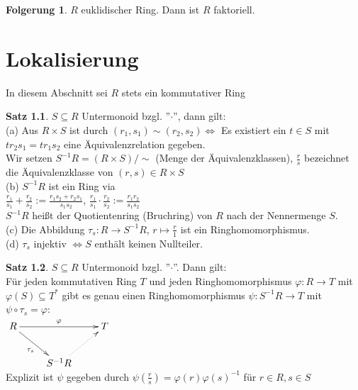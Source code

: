 \documentclass[10pt,a4paper,numbers=endperiod]{scrreprt}
\theoremstyle{definition}
\newtheorem{satz}{Satz}[section]
\newtheorem{folg}[satz]{Folgerung}
\begin{document}
\begin{folg}
	$R$ euklidischer Ring. Dann ist $R$ faktoriell.
\end{folg}

\chapter{Lokalisierung}$ $\\

In diesem Abschnitt sei $R$ stets ein kommutativer Ring

\begin{satz}
	$S \subseteq R$ Untermonoid bzgl. ''$\cdot$'', dann gilt:\\
	(a) Aus $R \times S$ ist durch $(r_1, s_1) \sim (r_2, s_2) \Leftrightarrow$ Es existiert ein $t \in S$ mit $tr_2s_1 = tr_1s_2$ eine Äquivalenzrelation gegeben.\\
	Wir setzen $S^{-1}R = (R \times S)/\sim$ (Menge der Äquivalenzklassen), $\frac{r}{s}$ bezeichnet die Äquivalenzklasse von $(r,s) \in R \times S$\\
	(b) $S^{-1}R$ ist ein Ring via\\
	$\frac{r_1}{s_1} + \frac{r_2}{s_2} := \frac{r_1s_2 + r_2s_1}{s_1s_2}$, $\frac{r_1}{s_1} \cdot \frac{r_2}{s_2} := \frac{r_1r_2}{s_1s_2}$\\
	$S^{-1}R$ heißt der Quotientenring (Bruchring) von $R$ nach der Nennermenge $S$.\\
	(c) Die Abbildung $\tau_s: R \rightarrow S^{-1}R$, $r \mapsto \frac{r}{1}$ ist ein Ringhomomorphismus.\\
	(d) $\tau_s$ injektiv $\Leftrightarrow S$ enthält keinen Nullteiler.
\end{satz}

\begin{satz}
	$S \subseteq R$ Untermonoid bzgl. ''$\cdot$''. Dann gilt:\\
	Für jeden kommutativen Ring $T$ und jeden Ringhomomorphismus $\varphi: R \rightarrow T$ mit $\varphi(S) \subseteq T^*$ gibt es genau einen Ringhomomorphismus $\psi: S^{-1} R \rightarrow T$ mit $\psi \circ \tau_s = \varphi$:\\
	$\begin{xy}
	\xymatrix{
		R \ar[rr]^{\varphi} \ar[dr]_{\tau_s} &     &  T \\
		& S^{-1}R \ar@{.>}[ur]
	}
	\end{xy}$\\
	Explizit ist $\psi$ gegeben durch $\psi(\frac{r}{s}) = \varphi(r) \varphi(s)^{-1}$ für $r \in R, s \in S$
\end{satz}
\end{document}
